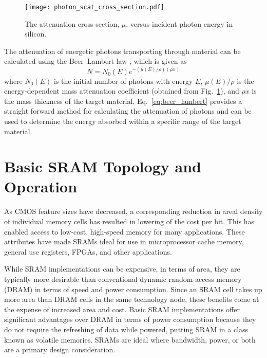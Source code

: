 \begin{figure}[tb]
    \begin{center}
        \texttt{[image: photon\_scat\_cross\_section.pdf]}
    \end{center}
    \caption{The attenuation cross-section, $\mu$, versus incident photon energy in silicon.}
    \label{fig:atten_cs_in_si}
\end{figure}

The attenuation of energetic photons transporting through material can be calculated using the Beer--Lambert law \cite{ingle1988spectrochemical}, which is given as
\begin{equation}
    \label{eq:beer_lambert}
    N = N_0(E) e^{-(\mu(E)/\rho) (\rho x)}
\end{equation}
where $N_0(E)$ is the initial number of photons with energy $E$, $\mu(E)/\rho$ is the energy-dependent mass attenuation coefficient (obtained from Fig.~\ref{fig:atten_cs_in_si}), and $\rho x$ is the mass thickness of the target material.
Eq.~\ref{eq:beer_lambert} provides a straight forward method for calculating the attenuation of photons and can be used to determine the energy absorbed within a specific range of the target material.

\section{Basic SRAM Topology and Operation} %
\label{sec:basic_sram_topology_and_operation}
As CMOS feature sizes have decreased, a corresponding reduction in areal density of individual memory cells has resulted in lowering of the cost per bit.
This has enabled access to low-cost, high-speed memory for many applications.
These attributes have made SRAMs ideal for use in microprocessor cache memory, general use registers, FPGAs, and other applications.

While SRAM implementations can be expensive, in terms of area, they are typically more desirable than conventional dynamic random access memory (DRAM) in terms of speed and power consumption.
Since an SRAM cell takes up more area than DRAM cells in the same technology node, these benefits come at the expense of increased area and cost.
Basic SRAM implementations offer significant advantages over DRAM in terms of power consumption because they do not require the refreshing of data while powered, putting SRAM in a class known as volatile memories.
SRAMs are ideal where bandwidth, power, or both are a primary design consideration.

